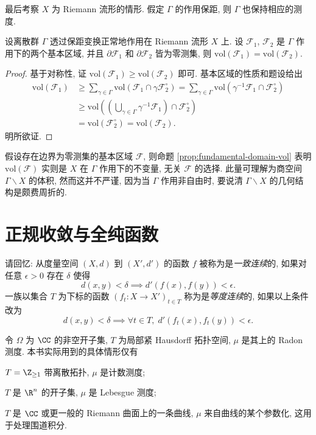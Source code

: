 最后考察 $X$ 为 Riemann 流形的情形. 假定 $\Gamma$ 的作用保距, 则 $\Gamma$ 也保持相应的测度.
\begin{proposition}\label{prop:fundamental-domain-vol}
	设离散群 $\Gamma$ 透过保距变换正常地作用在 Riemann 流形 $X$ 上. 设 $\mathcal{F}_1$, $\mathcal{F}_2$ 是 $\Gamma$ 作用下的两个基本区域, 并且 $\partial\mathcal{F}_1$ 和 $\partial\mathcal{F}_2$ 皆为零测集, 则 $\mathrm{vol}(\mathcal{F}_1) = \mathrm{vol}(\mathcal{F}_2)$.
\end{proposition}
\begin{proof}
	基于对称性, 证 $\mathrm{vol}(\mathcal{F}_1) \geq \mathrm{vol}(\mathcal{F}_2)$ 即可. 基本区域的性质和题设给出
	\begin{align*}
		\mathrm{vol}(\mathcal{F}_1) & \geq \sum_{\gamma \in \Gamma} \mathrm{vol}\left( \mathcal{F}_1 \cap \gamma\mathcal{F}_2^\circ \right) = \sum_{\gamma \in \Gamma} \mathrm{vol}\left( \gamma^{-1}\mathcal{F}_1 \cap \mathcal{F}_2^\circ \right) \\
		& \geq \mathrm{vol}\left( \left(\bigcup_{\gamma \in \Gamma} \gamma^{-1}\mathcal{F}_1\right) \cap \mathcal{F}_2^\circ \right) \\
		& = \mathrm{vol}\left( \mathcal{F}_2^\circ \right) = \mathrm{vol}\left( \mathcal{F}_2 \right).
	\end{align*}
	明所欲证.
\end{proof}

\begin{remark}\label{rem:fundamental-domain-vol}
	假设存在边界为零测集的基本区域 $\mathcal{F}$, 则命题 \ref{prop:fundamental-domain-vol} 表明 $\mathrm{vol}(\mathcal{F})$ 实则是 $X$ 在 $\Gamma$ 作用下的不变量, 无关 $\mathcal{F}$ 的选择. 此量可理解为商空间 $\Gamma \backslash X$ 的体积, 然而这并不严谨, 因为当 $\Gamma$ 作用非自由时, 要说清 $\Gamma \backslash X$ 的几何结构是颇费周折的.
\end{remark}

\section{正规收敛与全纯函数}\label{sec:holomorphy}
请回忆: 从度量空间 $(X, d)$ 到 $(X', d')$ 的函数 $f$ 被称为是\emph{一致连续}的, 如果对任意 $\epsilon > 0$ 存在 $\delta$ 使得
\[ d(x, y) < \delta \implies d'(f(x), f(y)) < \epsilon. \]
一族以集合 $T$ 为下标的函数 $(f_t: X \to X')_{t \in T}$ 称为是\emph{等度连续}的, 如果以上条件改为
\[ d(x, y) < \delta \implies \forall t \in T, \; d'\left(f_t(x), f_t(y)\right) < \epsilon. \]

令 $\Omega$ 为 $\CC$ 的非空开子集, $T$ 为局部紧 Hausdorff 拓扑空间, $\mu$ 是其上的 Radon 测度. 本书实际用到的具体情形仅有
\begin{compactitem}
	\item $T = \Z_{\geq 1}$ 带离散拓扑, $\mu$ 是计数测度;
	\item $T$ 是 $\R^n$ 的开子集, $\mu$ 是 Lebesgue 测度;
	\item $T$ 是 $\CC$ 或更一般的 Riemann 曲面上的一条曲线, $\mu$ 来自曲线的某个参数化, 这用于处理围道积分.
\end{compactitem}

